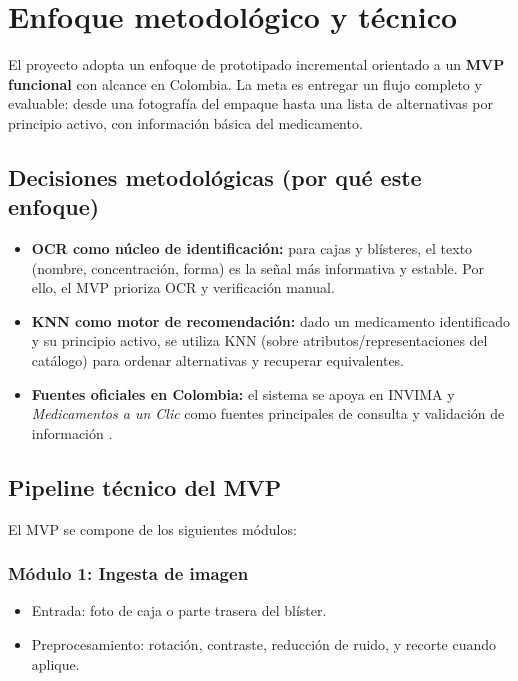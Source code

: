 \section{Enfoque metodológico y técnico}
\label{sec:metodologia}

El proyecto adopta un enfoque de prototipado incremental orientado a un \textbf{MVP funcional} con alcance en Colombia. La meta es entregar un flujo completo y evaluable: desde una fotografía del empaque hasta una lista de alternativas por principio activo, con información básica del medicamento.

\subsection{Decisiones metodológicas (por qué este enfoque)}
\begin{itemize}
	\item \textbf{OCR como núcleo de identificación:} para cajas y blísteres, el texto (nombre, concentración, forma) es la señal más informativa y estable. Por ello, el MVP prioriza OCR y verificación manual.
	\item \textbf{KNN como motor de recomendación:} dado un medicamento identificado y su principio activo, se utiliza KNN (sobre atributos/representaciones del catálogo) para ordenar alternativas y recuperar equivalentes.
	\item \textbf{Fuentes oficiales en Colombia:} el sistema se apoya en INVIMA y \textit{Medicamentos a un Clic} como fuentes principales de consulta y validación de información \cite{invima_registros,medicamentosaunclic}.
\end{itemize}

\subsection{Pipeline técnico del MVP}
El MVP se compone de los siguientes módulos:

\subsubsection{Módulo 1: Ingesta de imagen}
\begin{itemize}
	\item Entrada: foto de caja o parte trasera del blíster.
	\item Preprocesamiento: rotación, contraste, reducción de ruido, y recorte cuando aplique.
\end{itemize}

